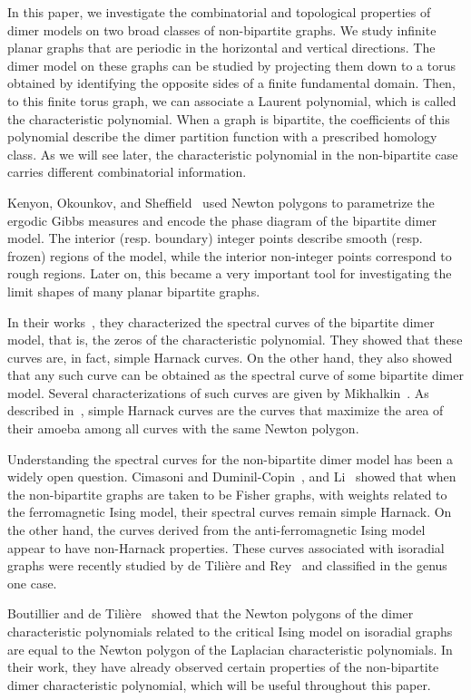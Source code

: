 \documentclass[12pt,a4paper]{article}
\theoremstyle{definition}
\begin{document}
In this paper, we investigate the combinatorial and topological properties of dimer models on two broad classes of non-bipartite graphs. We study infinite planar graphs that are periodic in the horizontal and vertical directions. The dimer model on these graphs can be studied by projecting them down to a torus obtained by identifying the opposite sides of a finite fundamental domain. Then, to this finite torus graph, we can associate a Laurent polynomial, which is called the characteristic polynomial. When a graph is bipartite, the coefficients of this polynomial describe the dimer partition function with a prescribed homology class. As we will see later, the characteristic polynomial in the non-bipartite case carries different combinatorial information.

Kenyon, Okounkov, and Sheffield~\cite{KOS06} used Newton polygons to parametrize the ergodic Gibbs measures and encode the phase diagram of the bipartite dimer model. The interior (resp. boundary) integer points describe smooth (resp. frozen) regions of the model, while the interior non-integer points correspond to rough regions. Later on, this became a very important tool for investigating the limit shapes of many planar bipartite graphs.

In their works~\cite{KO06,KOS06}, they characterized the spectral curves of the bipartite dimer model, that is, the zeros of the characteristic polynomial. They showed that these curves are, in fact, simple Harnack curves. On the other hand, they also showed that any such curve can be obtained as the spectral curve of some bipartite dimer model. Several characterizations of such curves are given by Mikhalkin~\cite{Mikhalkin00}. As described in~\cite{MikhalkinRullgard}, simple Harnack curves are the curves that maximize the area of their amoeba among all curves with the same Newton polygon. 

Understanding the spectral curves for the non-bipartite dimer model has been a widely open question. Cimasoni and Duminil-Copin~\cite{CimasoniDuminilCopin}, and Li~\cite{ZLi} showed that when the non-bipartite graphs are taken to be Fisher graphs, with weights related to the ferromagnetic Ising model, their spectral curves remain simple Harnack. On the other hand, the curves derived from the anti-ferromagnetic Ising model appear to have non-Harnack properties. These curves associated with isoradial graphs were recently studied by de Tilière and Rey~\cite{deTiliereRey} and classified in the genus one case.

Boutillier and de Tilière~\cite{BoutillierdeTiliere2010} showed that the Newton polygons of the dimer characteristic polynomials related to the critical Ising model on isoradial graphs are equal to the Newton polygon of the Laplacian characteristic polynomials. In their work, they have already observed certain properties of the non-bipartite dimer characteristic polynomial, which will be useful throughout this paper.
\end{document}
